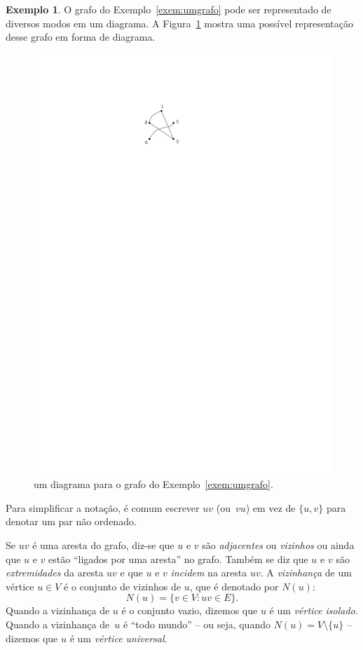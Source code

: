 \documentclass[12pt, a4paper]{article}
\theoremstyle{definition}
\newtheorem{exem}[teor]{Exemplo}
\begin{document}
\begin{exem}
O grafo do Exemplo~\ref{exem:umgrafo} pode ser representado de diversos modos em um diagrama. A Figura~\ref{fig:umgrafo} mostra uma possível representação desse grafo em forma de diagrama.
\begin{figure}
    \centering
    \includegraphics{umgrafo.pdf}
    \caption{um diagrama para o grafo do Exemplo~\ref{exem:umgrafo}.}
    \label{fig:umgrafo}
\end{figure}
\end{exem}

Para simplificar a notação, é comum escrever $uv$ (ou~$vu$) em vez de $\{u,v\}$ para denotar um par não ordenado.

Se $uv$ é uma aresta do grafo, diz-se que $u$ e $v$ são \emph{adjacentes} ou \emph{vizinhos} ou ainda que $u$ e $v$ estão ``ligados por uma aresta'' no grafo. Também se diz que $u$ e $v$ são \emph{extremidades} da aresta $uv$ e que $u$ e $v$ \emph{incidem} na aresta $uv$.  A \emph{vizinhança} de um vértice $u \in V$ é o conjunto de vizinhos de $u$, que é denotado por $N(u)$:
\[ N(u) = \{v \in V \colon uv \in E\}. \]
Quando a vizinhança de $u$ é o conjunto vazio, dizemos que $u$ é um \emph{vértice isolado}. Quando a vizinhança de~$u$ é ``todo mundo'' -- ou seja, quando $N(u) = V \setminus \{u\}$ -- dizemos que $u$ é um \emph{vértice universal}.
\end{document}
